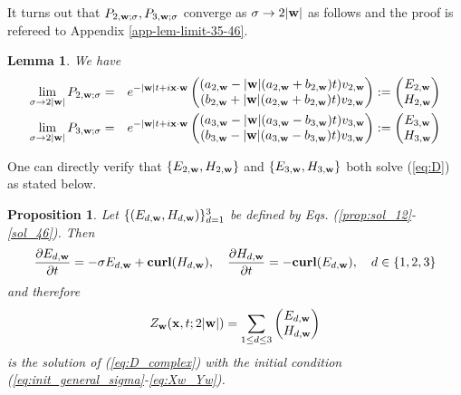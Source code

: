 \documentclass[10pt,reqno]{amsart}
\renewcommand{\(}{\left(}
\renewcommand{\)}{\right)}
\newcommand{\bw}{{\bf w}}
\newcommand{\CU}{{\bf curl}}
\newcommand{\bx}{\mathbf{x}}
\newtheorem{lem}[theo]{Lemma}
\newtheorem{prop}[theo]{Proposition}
\numberwithin{equation}{section}
\begin{document}
It turns out that $P_{2,\bw; \sigma}, P_{3,\bw; \sigma}$ converge as $\sigma\to 2|\bw|$ as follows and the proof is refereed to Appendix \ref{app-lem-limit-35-46}.
\begin{lem}\label{lem-limit-35-46}
	We have
	\begin{eqnarray}
		\lim_{\sigma\to 2|\bw| }P_{2,\bw; \sigma}&=&
		e^{- |\bw| t  +i\bx\cdot \bw} 
		\begin{pmatrix}
			(a_{2,\bw} - |\bw|(a_{2,\bw} + b_{2,\bw}) t)  v_{2,\bw}\\
			(b_{2,\bw} + |\bw|(a_{2,\bw} + b_{2,\bw}) t) v_{2,\bw}
		\end{pmatrix} := \begin{pmatrix}
			E_{2,\bw}\\
			H_{2,\bw}
		\end{pmatrix} \label{sol_35} \\
		\lim_{\sigma\to 2|\bw| }P_{3,\bw; \sigma} &=&e^{-|\bw|t+i\bx \cdot \bw}\begin{pmatrix}
			(a_{3,\bw}- |\bw|(a_{3,\bw}- b_{3,\bw})t)v_{3,\bw}\\
			(b_{3,\bw}- |\bw|(a_{3,\bw}- b_{3,\bw})t)v_{3,\bw}
		\end{pmatrix} :=   \begin{pmatrix}
			E_{3,\bw}\\
			H_{3,\bw}
		\end{pmatrix} \label{sol_46}
	\end{eqnarray} 
\end{lem}
One can directly verify that  $\{E_{2,\bw}, H_{2,\bw}\}$ and $\{E_{3,\bw}, H_{3,\bw}\}$ both solve (\ref{eq:D}) as stated below.
\begin{prop}\label{prop:special_sigma}
	Let $\{(E_{d,\bw}, H_{d,\bw})\}_{d=1}^3$ be defined by Eqs. (\ref{prop:sol_12}-\ref{sol_46}).  Then
	\begin{equation}\label{prop:sol_psi}
		\frac{\partial E_{d,\bw}}{\partial t} = -\sigma E_{d,\bw} + \CU (H_{d,\bw}), \quad \frac{\partial H_{d,\bw}}{\partial t} = -\CU (E_{d,\bw}), \quad d \in \{1,2,3\}
	\end{equation}
	and therefore 
	\begin{equation}\label{eq:Z_bw_special}
	Z_{\bw}(\bx,t; 2|\bw|) = \sum_{1\le d\le 3}  \begin{pmatrix}
		E_{d,\bw}\\
		H_{d,\bw}
	\end{pmatrix}
	\end{equation}
	is the solution of (\ref{eq:D_complex}) with the initial condition (\ref{eq:init_general_sigma}-\ref{eq:Xw_Yw}). 
\end{prop}
\end{document}
